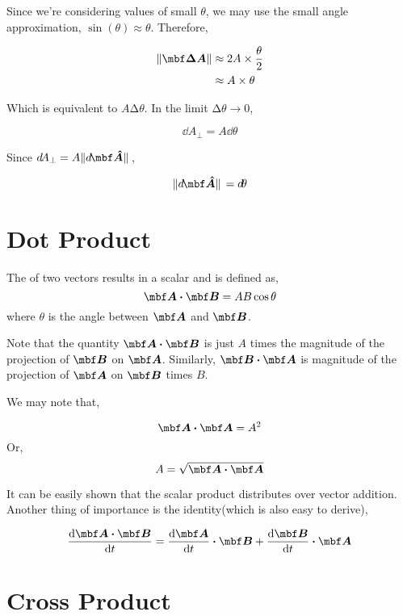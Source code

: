 Since we're considering values of small \(\theta\), we may use the small angle approximation,
\(\sin(\theta) \approx \theta\). Therefore,

\begin{marginfigure}
    \centering
    \caption{\(\increment\vec{A} \perp \vec{A}\)}
    \label{fig: timedev}
\end{marginfigure}

\begin{align}
    \norm{\vec{\increment A}} &\approx 2A \times \frac{\theta}{2}\\ 
    &\approx A \times \theta
\end{align}

Which is equivalent to \(A \increment \theta\). In the limit \(\increment \theta \to 0\),

\begin{equation}
    \dd{A_{\perp}} = A \dd{\theta}
\end{equation}

Since \(\dd{A}_{\perp} = A\norm*{\dd{\unitv{A}}}\),

\begin{equation}
    \norm*{\dd{\unitv{A}}} = \dd{\theta}
\end{equation}

\section{Dot Product}

The  of two vectors results in a scalar and is defined as,
\[\Aa \dtp \BB = AB \cos\theta\]
where \(\theta\) is the angle between \(\Aa\) and \(\BB\). 

Note that the quantity \(\Aa \dtp \BB\) is just \(A\) times 
the magnitude of the projection of \(\BB\) on \(\Aa\). Similarly, \(\BB \dtp \Aa\) is
magnitude of the projection of \(\Aa\) on \(\BB\) times \(B\).

We may note that,

\[\Aa \dtp \Aa = A^2\] Or,
\[A = \sqrt{\Aa \dtp \Aa}\]

It can be easily shown that the scalar product distributes over vector addition. 
Another thing of importance is the identity(which is also easy to derive),

\[\dv{\Aa \dtp \BB}{t} = \dv{\Aa}{t} \dtp \BB + \dv{\BB}{t} \dtp \Aa\]

\section{Cross Product}


